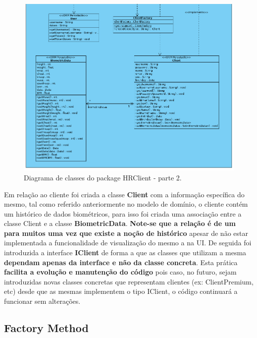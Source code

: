 \begin{figure}[H]
    \centering
    \includegraphics[scale=0.575]{images/arquitetura/client-package-2.png}
    \caption{Diagrama de classes do package HRClient - parte 2.}
    \label{fig:interfaceperfilptbycliente}
\end{figure}


\hspace{5mm} Em relação ao cliente foi criada a classe \textbf{Client} com a informação específica do mesmo, tal como referido anteriormente no modelo de domínio, o cliente contém um histórico de dados biométricos, para isso foi criada uma associação entre a classe Client e a classe \textbf{BiometricData}. \textbf{Note-se que a relação é de um para muitos uma vez que existe a noção de histórico} apesar de não estar implementada a funcionalidade de visualização do mesmo a na UI. De seguida foi introduzida a interface \textbf{IClient} de forma a que as classes que utilizam a mesma \textbf{dependam apenas da interface e não da classe concreta}. Esta prática \textbf{facilita a evolução e manutenção do código} pois caso, no futuro, sejam introduzidas novas classes concretas que representam clientes (ex: ClientPremium, etc) desde que as mesmas implementem o tipo IClient, o código continuará a funcionar sem alterações. 

\subsection{Factory Method}

